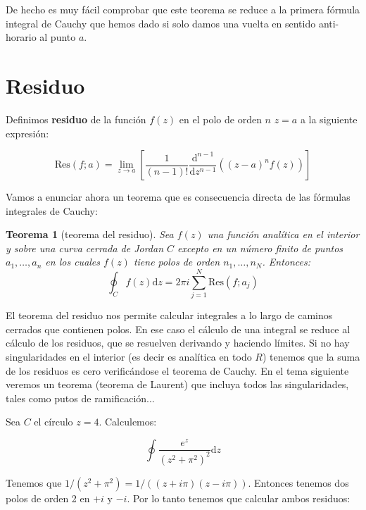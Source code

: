 \documentclass[12pt]{book}
\newcommand{\parentesis}[1]{\left( #1  \right)}
\newcommand{\ccorchetes}[1]{\left[ #1  \right]}
\newcommand{\D}{\mathrm{d}}
\newcommand{\Res}{\mathrm{Res}}
\newtheorem{theorem}{Teorema}[section]
\begin{document}
De hecho es muy fácil comprobar que este teorema se reduce a la primera fórmula integral de Cauchy que hemos dado si solo damos una vuelta en sentido anti-horario al punto $a$.

\section{Residuo}

Definimos \textbf{residuo} de la función $f(z)$ en el polo de orden $n$ $z=a$ a la siguiente expresión:

\begin{equation}
\Res (f;a) = \lim_{z \rightarrow a} \ccorchetes{\dfrac{1}{(n-1)!} \dfrac{\D^{n-1}}{\D z^{n-1}} \parentesis{(z-a)^n f(z)}}
\end{equation}

Vamos a enunciar ahora un teorema que es consecuencia directa de las fórmulas integrales de Cauchy:

\begin{theorem}[teorema del residuo]
Sea $f(z)$ una función analítica en el interior y sobre una curva cerrada de Jordan $C$ excepto en un número finito de puntos $a_1,\ldots,a_n$ en los cuales $f(z)$ tiene polos de orden $n_1,\ldots,n_N$. Entonces:
$$ \oint_C f(z) \D z = 2 \pi i \sum_{j=1}^N \Res (f;a_j) $$
\end{theorem}

El teorema del residuo nos permite calcular integrales a lo largo de caminos cerrados que contienen polos. En ese caso el cálculo de una integral se reduce al cálculo de los residuos, que se resuelven derivando y haciendo límites. Si no hay singularidades en el interior (es decir es analítica en todo $R$) tenemos que la suma de los residuos es cero verificándose el teorema de Cauchy. En el tema siguiente veremos un teorema (teorema de Laurent) que incluya todos las singularidades, tales como putos de ramificación... \\




\hrulefill

Sea $C$ el círculo $z=4$. Calculemos:

\begin{equation}
\oint  \frac{e^z}{(z^2+\pi^2)^2} \D z
\end{equation}

Tenemos que $1/(z^2+\pi^2) = 1/((z+i\pi)(z-i \pi))$. Entonces tenemos dos polos de orden 2 en $+i$ y $-i$. Por lo tanto tenemos que calcular ambos residuos:
\end{document}

